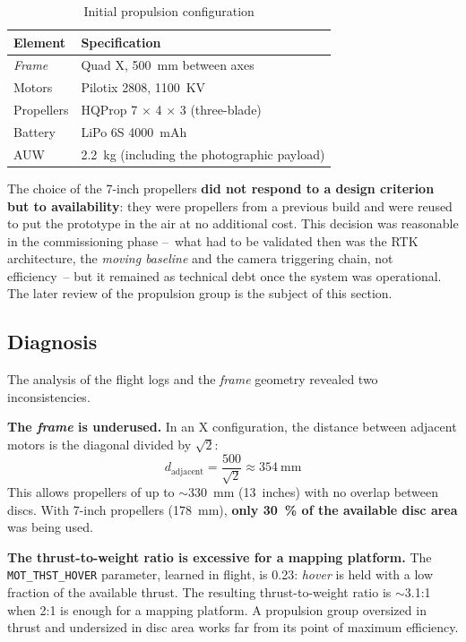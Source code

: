\begin{table}[H]
    \centering
    \caption{Initial propulsion configuration}
    \label{tab:propulsor-inicial}
    \begin{tabular}{ll}
        \toprule
        Element & Specification \\
        \midrule
        \emph{Frame} & Quad X, 500~mm between axes \\
        Motors & Pilotix 2808, 1100~KV \\
        Propellers & HQProp 7 $\times$ 4 $\times$ 3 (three-blade) \\
        Battery & LiPo 6S 4000~mAh \\
        AUW & 2.2~kg (including the photographic payload) \\
        \bottomrule
    \end{tabular}
\end{table}

The choice of the 7-inch propellers \textbf{did not respond to a design criterion but to availability}: they were propellers from a previous build and were reused to put the prototype in the air at no additional cost. This decision was reasonable in the commissioning phase --~what had to be validated then was the RTK architecture, the \emph{moving baseline} and the camera triggering chain, not efficiency~-- but it remained as technical debt once the system was operational. The later review of the propulsion group is the subject of this section.

\subsection{Diagnosis}
\label{subsec:propulsor-diagnostic}

The analysis of the flight logs and the \emph{frame} geometry revealed two inconsistencies.

\textbf{The \emph{frame} is underused.} In an X configuration, the distance between adjacent motors is the diagonal divided by $\sqrt{2}$:
\[
d_{\text{adjacent}} = \frac{500}{\sqrt{2}} \approx 354~\text{mm}
\]
This allows propellers of up to $\sim$330~mm (13~inches) with no overlap between discs. With 7-inch propellers (178~mm), \textbf{only 30~\% of the available disc area} was being used.

\textbf{The thrust-to-weight ratio is excessive for a mapping platform.} The \texttt{MOT\_THST\_HOVER} parameter, learned in flight, is 0.23: \emph{hover} is held with a low fraction of the available thrust. The resulting thrust-to-weight ratio is $\sim$3.1:1 when 2:1 is enough for a mapping platform. A propulsion group oversized in thrust and undersized in disc area works far from its point of maximum efficiency.

